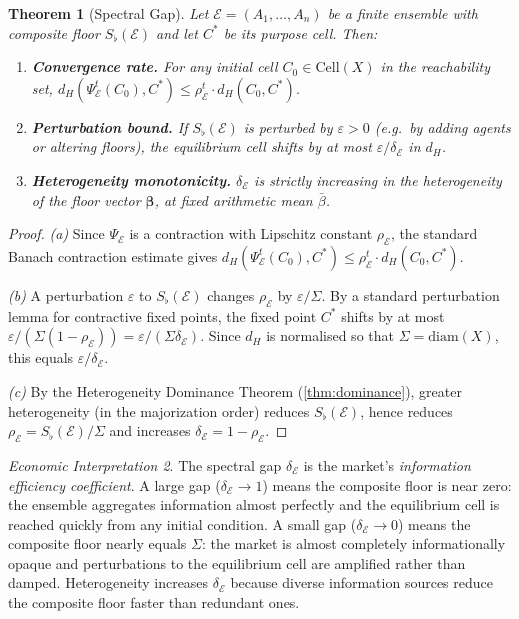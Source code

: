 \documentclass[twocolumn,11pt,a4paper]{article}
\newtheorem{theorem}{Theorem}[section]
\theoremstyle{remark}
\newtheorem{econinterp}[theorem]{Economic Interpretation}
\newcommand{\Sflat}{S_{\flat}}
\newcommand{\Ens}{\mathcal{E}}
\newcommand{\srad}{\rho}                  %
\newcommand{\sgap}{\delta}                %
\begin{document}
\begin{theorem}[Spectral Gap]
\label{thm:spectral-gap}
Let $\Ens = (A_1,\ldots,A_n)$ be a finite ensemble with composite floor
$\Sflat(\Ens)$ and let $C^*$ be its purpose cell.  Then:
\begin{enumerate}[label=\textup{(\alph*)}]
\item \textbf{Convergence rate.}  For any initial cell $C_0 \in
  \mathrm{Cell}(X)$ in the reachability set,
  $d_H(\Psi_\Ens^t(C_0), C^*) \le \srad_\Ens^t \cdot d_H(C_0, C^*)$.
\item \textbf{Perturbation bound.}  If $\Sflat(\Ens)$ is perturbed by
  $\varepsilon > 0$ (e.g.\ by adding agents or altering floors), the
  equilibrium cell shifts by at most $\varepsilon/\sgap_\Ens$ in $d_H$.
\item \textbf{Heterogeneity monotonicity.}  $\sgap_\Ens$ is strictly
  increasing in the heterogeneity of the floor vector $\boldsymbol\beta$,
  at fixed arithmetic mean $\bar\beta$.
\end{enumerate}
\end{theorem}
\begin{proof}
\textit{(a)}  Since $\Psi_\Ens$ is a contraction with Lipschitz constant
$\srad_\Ens$, the standard Banach contraction estimate gives
$d_H(\Psi_\Ens^t(C_0), C^*) \le \srad_\Ens^t \cdot d_H(C_0, C^*)$.

\textit{(b)}  A perturbation $\varepsilon$ to $\Sflat(\Ens)$ changes
$\srad_\Ens$ by $\varepsilon/\Sigma$.  By a standard perturbation lemma for
contractive fixed points, the fixed point $C^*$ shifts by at most
$\varepsilon/(\Sigma(1-\srad_\Ens)) = \varepsilon/(\Sigma\sgap_\Ens)$.
Since $d_H$ is normalised so that $\Sigma = \mathrm{diam}(X)$, this equals
$\varepsilon/\sgap_\Ens$.

\textit{(c)}  By the Heterogeneity Dominance Theorem (\cref{thm:dominance}),
greater heterogeneity (in the majorization order) reduces $\Sflat(\Ens)$,
hence reduces $\srad_\Ens = \Sflat(\Ens)/\Sigma$ and increases
$\sgap_\Ens = 1 - \srad_\Ens$.
\end{proof}

\begin{econinterp}
\label{ei:spectral-gap}
The spectral gap $\sgap_\Ens$ is the market's \emph{information efficiency
coefficient}.  A large gap ($\sgap_\Ens \to 1$) means the composite floor
is near zero: the ensemble aggregates information almost perfectly and the
equilibrium cell is reached quickly from any initial condition.  A small gap
($\sgap_\Ens \to 0$) means the composite floor nearly equals $\Sigma$:
the market is almost completely informationally opaque and perturbations
to the equilibrium cell are amplified rather than damped.  Heterogeneity
increases $\sgap_\Ens$ because diverse information sources reduce the
composite floor faster than redundant ones.
\end{econinterp}
\end{document}
